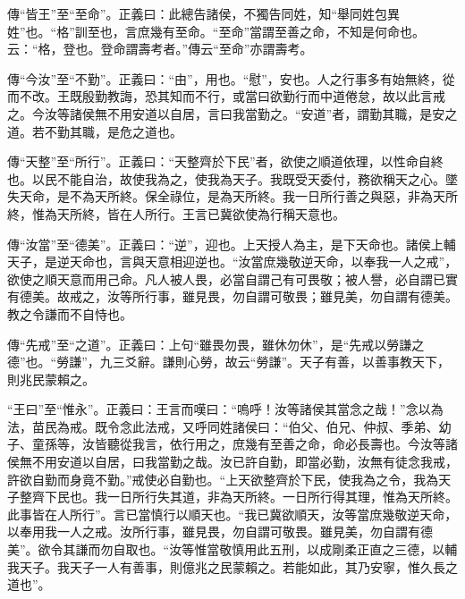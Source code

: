 {\noindent\zhuan{}\fzbyks 傳“皆王”至“至命”。正義曰：此總告諸侯，不獨告同姓，知“舉同姓包異姓”也。“格”訓至也，言庶幾有至命。“至命”當謂至善之命，不知是何命也。云：“格，登也。登命謂壽考者。”傳云“至命”亦謂壽考。 \par}

{\noindent\zhuan{}\fzbyks 傳“今汝”至“不勤”。正義曰：“由”，用也。“慰”，安也。人之行事多有始無終，從而不改。王既殷勤教誨，恐其知而不行，或當曰欲勤行而中道倦怠，故以此言戒之。今汝等諸侯無不用安道以自居，言曰我當勤之。“安道”者，謂勤其職，是安之道。若不勤其職，是危之道也。 \par}

{\noindent\zhuan{}\fzbyks 傳“天整”至“所行”。正義曰：“天整齊於下民”者，欲使之順道依理，以性命自終也。以民不能自治，故使我為之，使我為天子。我既受天委付，務欲稱天之心。墜失天命，是不為天所終。保全祿位，是為天所終。我一日所行善之與惡，非為天所終，惟為天所終，皆在人所行。王言已冀欲使為行稱天意也。 \par}

{\noindent\zhuan{}\fzbyks 傳“汝當”至“德美”。正義曰：“逆”，迎也。上天授人為主，是下天命也。諸侯上輔天子，是逆天命也，言與天意相迎逆也。“汝當庶幾敬逆天命，以奉我一人之戒”，欲使之順天意而用己命。凡人被人畏，必當自謂己有可畏敬；被人譽，必自謂已實有德美。故戒之，汝等所行事，雖見畏，勿自謂可敬畏；雖見美，勿自謂有德美。教之令謙而不自恃也。 \par}

{\noindent\zhuan{}\fzbyks 傳“先戒”至“之道”。正義曰：上句“雖畏勿畏，雖休勿休”，是“先戒以勞謙之德”也。“勞謙”，九三爻辭。謙則心勞，故云“勞謙”。天子有善，以善事教天下，則兆民蒙賴之。 \par}

{\noindent\shu{}\fzkt “王曰”至“惟永”。正義曰：王言而嘆曰：“嗚呼！汝等諸侯其當念之哉！”念以為法，苗民為戒。既令念此法戒，又呼同姓諸侯曰：“伯父、伯兄、仲叔、季弟、幼子、童孫等，汝皆聽從我言，依行用之，庶幾有至善之命，命必長壽也。今汝等諸侯無不用安道以自居，曰我當勤之哉。汝已許自勤，即當必勤，汝無有徒念我戒，許欲自勤而身竟不勤。”戒使必自勤也。“上天欲整齊於下民，使我為之令，我為天子整齊下民也。我一日所行失其道，非為天所終。一日所行得其理，惟為天所終。此事皆在人所行”。言已當慎行以順天也。“我已冀欲順天，汝等當庶幾敬逆天命，以奉用我一人之戒。汝所行事，雖見畏，勿自謂可敬畏。雖見美，勿自謂有德美”。欲令其謙而勿自取也。“汝等惟當敬慎用此五刑，以成剛柔正直之三德，以輔我天子。我天子一人有善事，則億兆之民蒙賴之。若能如此，其乃安寧，惟久長之道也”。 \par}

